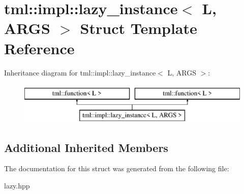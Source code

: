 \hypertarget{structtml_1_1impl_1_1lazy__instance}{\section{tml\+:\+:impl\+:\+:lazy\+\_\+instance$<$ L, A\+R\+G\+S $>$ Struct Template Reference}
\label{structtml_1_1impl_1_1lazy__instance}
}
Inheritance diagram for tml\+:\+:impl\+:\+:lazy\+\_\+instance$<$ L, A\+R\+G\+S $>$\+:\begin{figure}[H]
\begin{center}
\leavevmode
\includegraphics[height=2.000000cm]{structtml_1_1impl_1_1lazy__instance}
\end{center}
\end{figure}
\subsection*{Additional Inherited Members}


The documentation for this struct was generated from the following file\+:\begin{DoxyCompactItemize}
\item 
lazy.\+hpp\end{DoxyCompactItemize}
